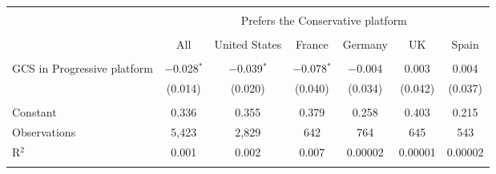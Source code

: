 
\begin{tabular}{@{\extracolsep{5pt}}lcccccc} 
\\[-1.8ex]\hline 
\hline \\[-1.8ex] 
 & \multicolumn{6}{c}{Prefers the Conservative platform} \\ 
\cline{2-7} 
\\[-1.8ex] & All & United States & France & Germany & UK & Spain \\ 
\hline \\[-1.8ex] 
 GCS in Progressive platform & $-$0.028$^{*}$ & $-$0.039$^{*}$ & $-$0.078$^{*}$ & $-$0.004 & 0.003 & 0.004 \\ 
  & (0.014) & (0.020) & (0.040) & (0.034) & (0.042) & (0.037) \\ 
 \hline \\[-1.8ex] 
Constant & 0.336 & 0.355 & 0.379 & 0.258 & 0.403 & 0.215 \\ 
Observations & 5,423 & 2,829 & 642 & 764 & 645 & 543 \\ 
R$^{2}$ & 0.001 & 0.002 & 0.007 & 0.00002 & 0.00001 & 0.00002 \\ 
\hline 
\hline \\[-1.8ex] 
\end{tabular} 
